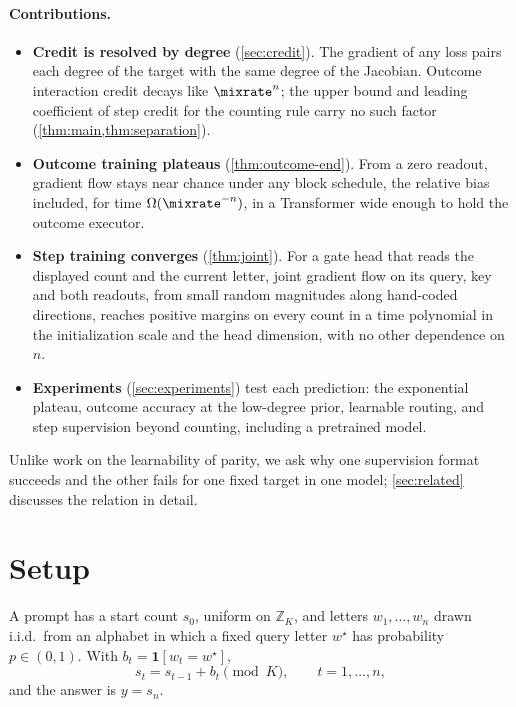 \paragraph{Contributions.}
\begin{itemize}[leftmargin=*,itemsep=2pt,topsep=3pt]
\item \textbf{Credit is resolved by degree} (\cref{sec:credit}). The gradient of any loss pairs each degree of the
target with the same degree of the Jacobian. Outcome interaction credit decays like $\mixrate^n$; the upper bound and leading coefficient of step credit
for the counting rule carry no such factor (\cref{thm:main,thm:separation}).
\item \textbf{Outcome training plateaus} (\cref{thm:outcome-end}). From a zero readout, gradient flow stays near chance under any block schedule, the relative bias included,
for time $\Omega(\mixrate^{-n})$, in a Transformer wide enough to hold the outcome executor.
\item \textbf{Step training converges} (\cref{thm:joint}). For a gate head that reads the displayed count and the current
letter, joint gradient flow on its query, key and both readouts, from small random magnitudes along hand-coded directions,
reaches positive margins on every count in a time polynomial in the initialization scale and the head dimension, with no other dependence on $n$.
\item \textbf{Experiments} (\cref{sec:experiments}) test each prediction: the exponential plateau, outcome accuracy at the
low-degree prior, learnable routing, and step supervision beyond counting, including a pretrained model.
\end{itemize}

Unlike work on the learnability of parity, we ask why one supervision format succeeds and the other fails for one fixed
target in one model; \cref{sec:related} discusses the relation in detail.

\section{Setup}
\label{sec:setup}
\label{sec:setting}

\begin{definition}
\label{def:task}
A prompt has a start count $s_0$, uniform on $\mathbb Z_K$, and letters $w_1,\ldots,w_n$ drawn i.i.d.\ from an alphabet
in which a fixed query letter $w^\star$ has probability $p\in(0,1)$. With $b_t=\mathbf 1[w_t=w^\star]$,
\begin{equation}
 s_t=s_{t-1}+b_t\pmod K,\qquad t=1,\ldots,n,
 \label{eq:tracking}
\end{equation}
and the answer is $y=s_n$.
\end{definition}

